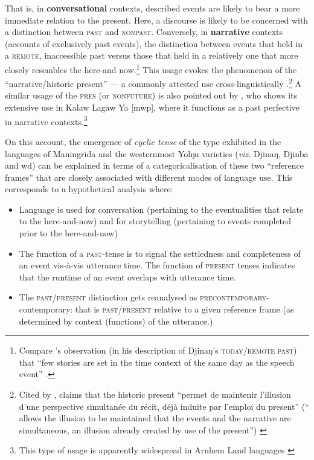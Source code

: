  That is, in \textbf{conversational} contexts, described events are likely to bear a more immediate relation to the present. Here, a discourse is likely to be concerned with a distinction between {\color{blue}\textsc{past}} and {\color{forest}\textsc{nonpast}}. Conversely, in \textbf{narrative} contexts (accounts of exclusively past events), the distinction between events that held in a {\color{blue}\textsc{remote}}, inaccessible past versus those that held in a relatively \textsc{\color{forest}{recent}} one that more closely resembles the here-and now.\footnote{Compare \citeauthor{Waters1989}'s observation (in his description of Djinaŋ's \textsc{today/remote past}) that ``few stories are set in the time context of the same day as the speech event'' \citeyearpar[188]{Waters1989}.} This usage evokes the phenomenon of the ``narrative/historic present'' --- a commonly attested use cross-linguistically  \citetext{see \citealp{Carruthers2012} for an overview}.\footnote{Cited by \citet[312]{Carruthers2012}, \citeauthor{Facques2007} claims that the historic present ``permet de maintenir l’illusion d’une perspective simultanée du récit, déjà induite par l’emploi du present” (``
 	allows the	illusion to be maintained that the events and the narrative are simultaneous, an illusion already created by use of the present”) \citetext{\citeyear[250--1]{Facques2007}, Carruthers' translation.}} A similar usage of the \textsc{pres} (or \textsc{nonfuture}) is also pointed out by \citet{Stirling2012a}, who shows its extensive use in Kalaw Lagaw Ya [\gls{mwp}], where it functions as a past perfective in narrative contexts.\footnote{This type of usage is apparently widespread in Arnhem Land languages \citetext{\citealt[\textit{e.g.},][]{Bednall2019} for Anindilyakwa [\gls{aoi}]}}
 
On this account, the emergence of \textit{cyclic tense} of the type exhibited in the languages of Maningrida and the westernmost Yolŋu varieties (\textit{viz.} Djinaŋ, Djinba and \gls{wd}) can be explained in terms of a categoricalisation of these two ``reference frames'' that are closely associated with different modes of language use. This corresponds to a hypothetical analysis where: 
\begin{itemize}
	\item Language is used for conversation (pertaining to the eventualities that relate to the here-and-now) and for storytelling (pertaining to events completed prior to the here-and-now)
	\item The function of a \textsc{past}-tense is to signal the settledness and completeness of an event vis-à-vis utterance time. The function of \textsc{present} tenses indicates that the runtime of an event overlaps with utterance time.
	\item The \textsc{past}/\textsc{present} distinction gets reanalysed as \textsc{precontemporary}-{\sc contemporary}: that is \textsc{past/present} relative to a given reference frame (as determined by context (functions) of the utterance.)
\end{itemize}

